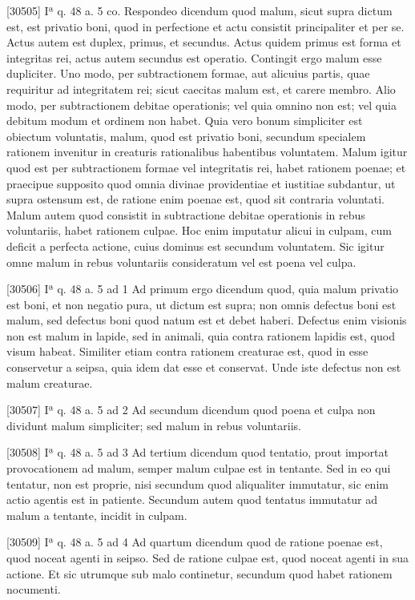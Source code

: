 \documentclass[10pt]{jsarticle} %
\begin{document}
[30505] Iª q. 48 a. 5 co. Respondeo dicendum quod malum, sicut supra dictum est, est privatio boni, quod in perfectione et actu consistit principaliter et per se. Actus autem est duplex, primus, et secundus. Actus quidem primus est forma et integritas rei, actus autem secundus est operatio. Contingit ergo malum esse dupliciter. Uno modo, per subtractionem formae, aut alicuius partis, quae requiritur ad integritatem rei; sicut caecitas malum est, et carere membro. Alio modo, per subtractionem debitae operationis; vel quia omnino non est; vel quia debitum modum et ordinem non habet. Quia vero bonum simpliciter est obiectum voluntatis, malum, quod est privatio boni, secundum specialem rationem invenitur in creaturis rationalibus habentibus voluntatem. Malum igitur quod est per subtractionem formae vel integritatis rei, habet rationem poenae; et praecipue supposito quod omnia divinae providentiae et iustitiae subdantur, ut supra ostensum est, de ratione enim poenae est, quod sit contraria voluntati. Malum autem quod consistit in subtractione debitae operationis in rebus voluntariis, habet rationem culpae. Hoc enim imputatur alicui in culpam, cum deficit a perfecta actione, cuius dominus est secundum voluntatem. Sic igitur omne malum in rebus voluntariis consideratum vel est poena vel culpa.

[30506] Iª q. 48 a. 5 ad 1 Ad primum ergo dicendum quod, quia malum privatio est boni, et non negatio pura, ut dictum est supra; non omnis defectus boni est malum, sed defectus boni quod natum est et debet haberi. Defectus enim visionis non est malum in lapide, sed in animali, quia contra rationem lapidis est, quod visum habeat. Similiter etiam contra rationem creaturae est, quod in esse conservetur a seipsa, quia idem dat esse et conservat. Unde iste defectus non est malum creaturae.

[30507] Iª q. 48 a. 5 ad 2 Ad secundum dicendum quod poena et culpa non dividunt malum simpliciter; sed malum in rebus voluntariis.

[30508] Iª q. 48 a. 5 ad 3 Ad tertium dicendum quod tentatio, prout importat provocationem ad malum, semper malum culpae est in tentante. Sed in eo qui tentatur, non est proprie, nisi secundum quod aliqualiter immutatur, sic enim actio agentis est in patiente. Secundum autem quod tentatus immutatur ad malum a tentante, incidit in culpam.

[30509] Iª q. 48 a. 5 ad 4 Ad quartum dicendum quod de ratione poenae est, quod noceat agenti in seipso. Sed de ratione culpae est, quod noceat agenti in sua actione. Et sic utrumque sub malo continetur, secundum quod habet rationem nocumenti.
\end{document}
